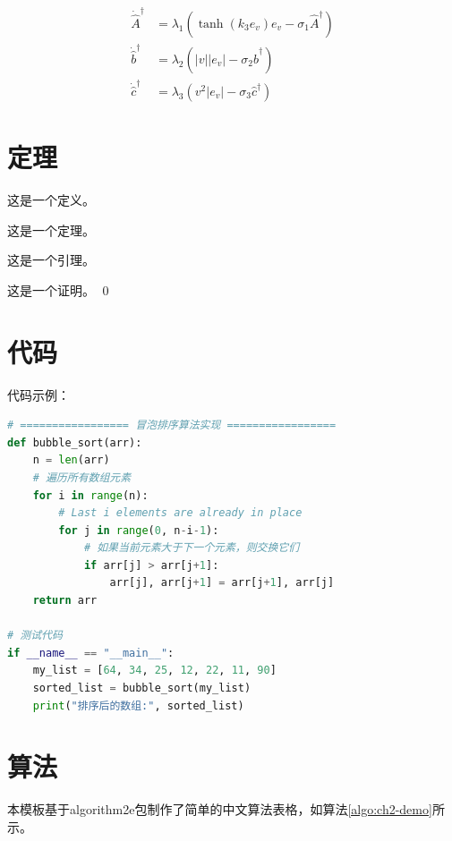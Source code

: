 \begin{subequations}\label{eq:ch2-align}
	\begin{align}
		\dot{\hat{A}}^\dag&=\lambda_1\left(\tanh(k_3e_v)e_v-\sigma_1\hat{A}^\dag\right)\\
		\dot{\hat{b}}^\dag&=\lambda_2\left(|v||e_v|-\sigma_2\hat{b}^\dag\right)\\
		\dot{\hat{c}}^\dag&=\lambda_3\left(v^2|e_v|-\sigma_3\hat{c}^\dag\right)
	\end{align}
\end{subequations}



\section{定理}

\begin{Definition}
	这是一个定义。
\end{Definition}

\begin{Theorem}
	这是一个定理。
\end{Theorem}

\begin{Lemma}
	这是一个引理。
\end{Lemma}

\begin{Proof}
	这是一个证明。
	\qed
\end{Proof}


\section{代码}

代码示例：

\begin{lstlisting}[language=Python]
# ================= 冒泡排序算法实现 =================
def bubble_sort(arr):
    n = len(arr)
    # 遍历所有数组元素
    for i in range(n):
        # Last i elements are already in place
        for j in range(0, n-i-1):
            # 如果当前元素大于下一个元素，则交换它们
            if arr[j] > arr[j+1]:
                arr[j], arr[j+1] = arr[j+1], arr[j]
    return arr

# 测试代码
if __name__ == "__main__":
    my_list = [64, 34, 25, 12, 22, 11, 90]
    sorted_list = bubble_sort(my_list)
    print("排序后的数组:", sorted_list)
\end{lstlisting}

\section{算法}
本模板基于algorithm2e包制作了简单的中文算法表格，如算法\ref{algo:ch2-demo}所示。

